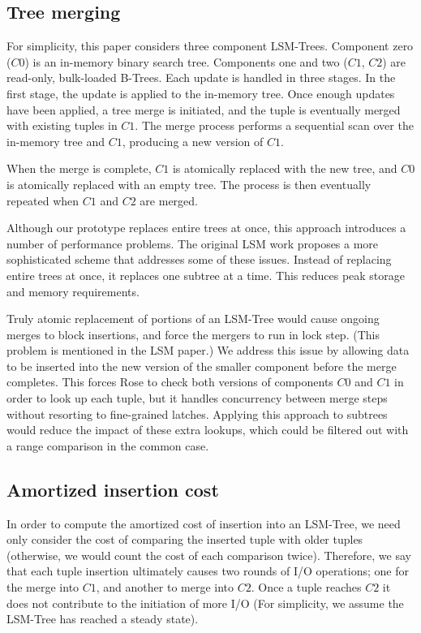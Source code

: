 \documentclass{vldb}
\newcommand{\rows}{Rose\xspace}
\begin{document}
\subsection{Tree merging}


For simplicity,
this paper considers three component LSM-Trees.  Component zero ($C0$)
is an in-memory binary search tree.  Components one and two ($C1$,
$C2$) are read-only, bulk-loaded B-Trees.  
Each update is handled in three stages.  In the first stage, the
update is applied to the in-memory tree.  Once enough updates
have been applied, a tree merge is initiated, and the tuple is
eventually merged with existing tuples in $C1$.  The merge process
performs a sequential scan over the in-memory tree and $C1$, producing
a new version of $C1$.

When the merge is complete, $C1$ is atomically replaced
with the new tree, and $C0$ is atomically replaced with an empty tree.
The process is then eventually repeated when $C1$ and $C2$ are merged.

Although our prototype replaces entire trees at once, this approach
introduces a number of performance problems.  The original LSM work
proposes a more sophisticated scheme that addresses some of these
issues.  Instead of replacing entire trees at once, it replaces one
subtree at a time.  This reduces peak storage and memory requirements.

Truly atomic replacement of portions of an LSM-Tree would cause ongoing
merges to block insertions, and force the mergers to run in lock step.
(This problem is mentioned in the LSM
paper.)  We address this issue by allowing data to be inserted into
the new version of the smaller component before the merge completes.
This forces \rows to check both versions of components $C0$ and $C1$
in order to look up each tuple, but it handles concurrency between merge steps
without resorting to fine-grained latches.  Applying this
approach to subtrees would reduce the impact of these extra lookups,
which could be filtered out with a range comparison in the common
case.

\subsection{Amortized insertion cost}

In order to compute the amortized cost of insertion into an LSM-Tree,
we need only consider the cost of comparing the inserted tuple with
older tuples (otherwise, we would count the cost of each comparison
twice).  Therefore, we say that each tuple insertion ultimately causes
two rounds of I/O operations; one for the merge into $C1$, and another
to merge into $C2$.  Once a tuple reaches $C2$ it does not contribute
to the initiation of more I/O (For simplicity, we assume the LSM-Tree
has reached a steady state).
\end{document}
